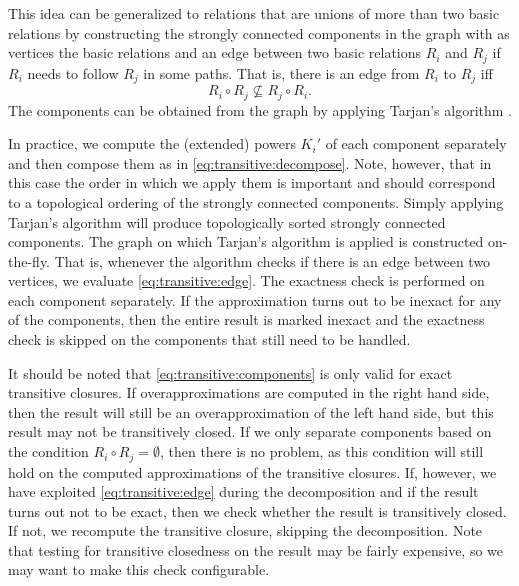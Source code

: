 This idea can be generalized to relations that are unions
of more than two basic relations by constructing the
strongly connected components in the graph with as vertices
the basic relations and an edge between two basic relations
$R_i$ and $R_j$ if $R_i$ needs to follow $R_j$ in some paths.
That is, there is an edge from $R_i$ to $R_j$ iff
\begin{equation}
\label{eq:transitive:edge}
R_i \circ R_j
\not\subseteq
R_j \circ R_i
.
\end{equation}
The components can be obtained from the graph by applying
Tarjan's algorithm .

In practice, we compute the (extended) powers $K_i'$ of each component
separately and then compose them as in \eqref{eq:transitive:decompose}.
Note, however, that in this case the order in which we apply them is
important and should correspond to a topological ordering of the
strongly connected components.  Simply applying Tarjan's
algorithm will produce topologically sorted strongly connected components.
The graph on which Tarjan's algorithm is applied is constructed on-the-fly.
That is, whenever the algorithm checks if there is an edge between
two vertices, we evaluate \eqref{eq:transitive:edge}.
The exactness check is performed on each component separately.
If the approximation turns out to be inexact for any of the components,
then the entire result is marked inexact and the exactness check
is skipped on the components that still need to be handled.

It should be noted that \eqref{eq:transitive:components}
is only valid for exact transitive closures.
If overapproximations are computed in the right hand side, then the result will
still be an overapproximation of the left hand side, but this result
may not be transitively closed.  If we only separate components based
on the condition $R_i \circ R_j = \emptyset$, then there is no problem,
as this condition will still hold on the computed approximations
of the transitive closures.  If, however, we have exploited
\eqref{eq:transitive:edge} during the decomposition and if the
result turns out not to be exact, then we check whether
the result is transitively closed.  If not, we recompute
the transitive closure, skipping the decomposition.
Note that testing for transitive closedness on the result may
be fairly expensive, so we may want to make this check
configurable.

